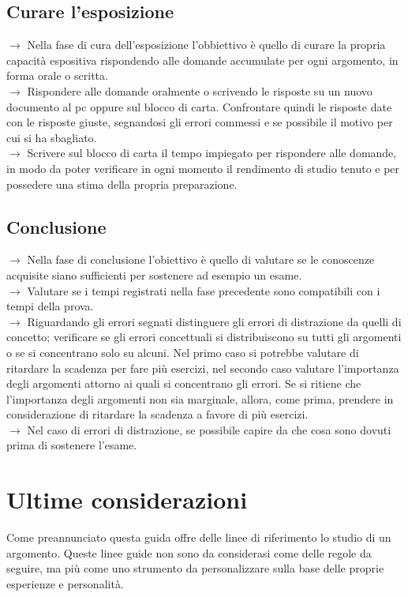 \documentclass[11pt,a4paper]{article}
\begin{document}
\subsection{Curare l'esposizione}
$\rightarrow$ Nella fase di cura dell'esposizione l'obbiettivo è quello di curare la propria capacità espositiva rispondendo alle domande accumulate per ogni argomento, in forma orale o scritta.\\
$\rightarrow$ Rispondere alle domande oralmente o scrivendo le risposte su un nuovo documento al pc oppure sul blocco di carta. Confrontare quindi le risposte date con le risposte giuste, segnandosi gli errori commessi e se possibile il motivo per cui si ha sbagliato.\\
$\rightarrow$ Scrivere sul blocco di carta il tempo impiegato per rispondere alle domande, in modo da poter verificare in ogni momento il rendimento di studio tenuto e per possedere una stima della propria preparazione.\\

\subsection{Conclusione}
$\rightarrow$ Nella fase di conclusione l'obiettivo è quello di valutare se le conoscenze acquisite siano sufficienti per sostenere ad esempio un esame. \\
$\rightarrow$ Valutare se i tempi registrati nella fase precedente sono compatibili con i tempi della prova.\\
$\rightarrow$ Riguardando gli errori segnati distinguere gli errori di distrazione da quelli di concetto; verificare se gli errori concettuali si distribuiscono su tutti gli argomenti o se si concentrano solo su alcuni.  Nel primo caso si potrebbe valutare di ritardare la scadenza per fare più esercizi, nel secondo caso valutare l'importanza degli argomenti attorno ai quali si concentrano gli errori. Se si ritiene che l'importanza degli argomenti non sia marginale, allora, come prima, prendere in considerazione di ritardare la scadenza a favore di più esercizi.\\
$\rightarrow$ Nel caso di errori di distrazione, se possibile capire da che cosa sono dovuti prima di sostenere l'esame.\\

\section{Ultime considerazioni}
Come preannunciato questa guida offre delle linee di riferimento lo studio di un argomento. Queste linee guide non sono da considerasi come delle regole da seguire, ma più come uno strumento da personalizzare sulla base delle proprie esperienze e personalità. \\
	
\end{document}
